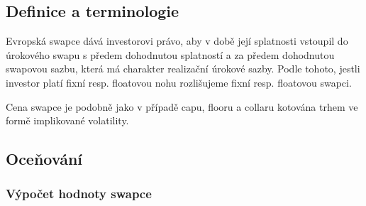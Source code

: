 \documentclass[a4paper]{book}
\begin{document}
\subsection{Definice a terminologie}

Evropská swapce dává investorovi právo, aby v době její splatnosti vstoupil do úrokového swapu s předem dohodnutou splatností a za předem dohodnutou swapovou sazbu, která má charakter realizační úrokové sazby. Podle tohoto, jestli investor platí fixní resp. floatovou nohu rozlišujeme fixní resp. floatovou swapci.

Cena swapce je podobně jako v případě capu, flooru a collaru kotována trhem ve formě implikované volatility.

\subsection{Oceňování}

\subsubsection{Výpočet hodnoty swapce}
\end{document}
